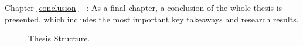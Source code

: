Chapter \ref{conclusion} - :
As a final chapter, a conclusion of the whole thesis is presented,
which includes the most important key takeaways and research results.

\begin{figure}[h]
	\centering
	\caption{Thesis Structure.
	}
	\label{fig:thesis-structure-simple-overview}	
\end{figure}





















%


